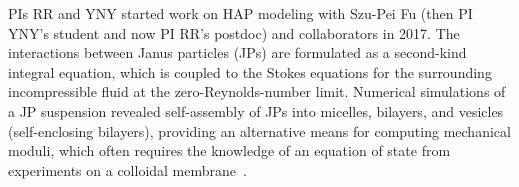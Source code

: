 %
%
PIs RR and YNY started work on HAP modeling with Szu-Pei Fu (then PI
YNY's student and now PI RR's postdoc) and collaborators in 2017. The
interactions between Janus particles (JPs) are formulated as a
second-kind integral equation, which is coupled to the Stokes equations
for the surrounding incompressible fluid at the zero-Reynolds-number
limit. Numerical simulations of a JP suspension revealed self-assembly
of JPs into micelles, bilayers, and vesicles (self-enclosing bilayers),
providing an alternative means for computing mechanical moduli, which
often requires the knowledge of an equation of state from experiments on
a colloidal membrane~\cite{Balchunas2019_SM}.

